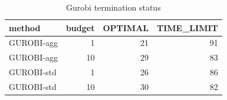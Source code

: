 \begin{table}[htbp]
\centering
\small
\caption{Gurobi termination status}
\label{tab:E4a_equal_budgets_gurobi_status}
\begin{tabular}{lrrr}
\toprule
method & budget & OPTIMAL & TIME\_LIMIT \\
\midrule
GUROBI-agg & 1 & 21 & 91 \\
GUROBI-agg & 10 & 29 & 83 \\
GUROBI-std & 1 & 26 & 86 \\
GUROBI-std & 10 & 30 & 82 \\
\bottomrule
\end{tabular}
\end{table}
